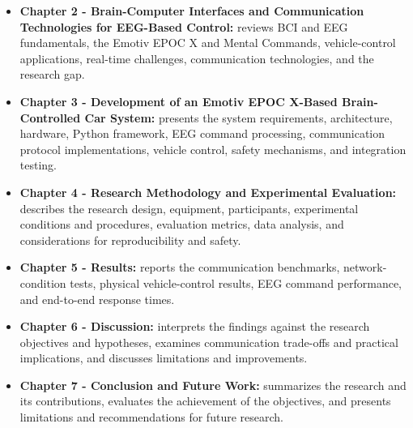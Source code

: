 \begin{itemize}
  \item \textbf{Chapter 2 - Brain-Computer Interfaces and Communication Technologies for EEG-Based Control:} reviews BCI and EEG fundamentals, the Emotiv EPOC X and Mental Commands, vehicle-control applications, real-time challenges, communication technologies, and the research gap.
  \item \textbf{Chapter 3 - Development of an Emotiv EPOC X-Based Brain-Controlled Car System:} presents the system requirements, architecture, hardware, Python framework, EEG command processing, communication protocol implementations, vehicle control, safety mechanisms, and integration testing.
  \item \textbf{Chapter 4 - Research Methodology and Experimental Evaluation:} describes the research design, equipment, participants, experimental conditions and procedures, evaluation metrics, data analysis, and considerations for reproducibility and safety.
  \item \textbf{Chapter 5 - Results:} reports the communication benchmarks, network-condition tests, physical vehicle-control results, EEG command performance, and end-to-end response times.
  \item \textbf{Chapter 6 - Discussion:} interprets the findings against the research objectives and hypotheses, examines communication trade-offs and practical implications, and discusses limitations and improvements.
  \item \textbf{Chapter 7 - Conclusion and Future Work:} summarizes the research and its contributions, evaluates the achievement of the objectives, and presents limitations and recommendations for future research.
\end{itemize}
